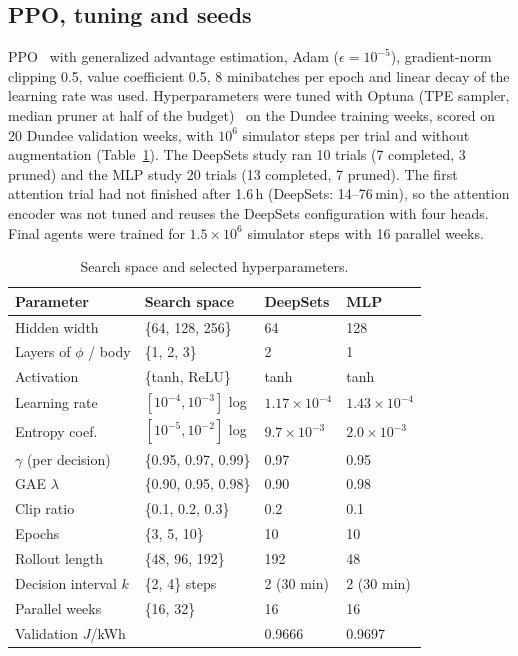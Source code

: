 \documentclass[conference]{IEEEtran}
\begin{document}
\subsection{PPO, tuning and seeds}
PPO~\cite{schulman2017ppo} with generalized advantage estimation, Adam ($\epsilon=10^{-5}$),
gradient-norm clipping 0.5, value coefficient 0.5, 8 minibatches per epoch and linear decay of the
learning rate was used. Hyperparameters were tuned with Optuna (TPE sampler, median pruner at half
of the budget)~\cite{akiba2019optuna} on the Dundee training weeks, scored on 20 Dundee validation
weeks, with $10^6$ simulator steps per trial and without augmentation (Table~\ref{tab:hpo}). The
DeepSets study ran 10 trials (7 completed, 3 pruned) and the MLP study 20 trials (13 completed,
7 pruned). The first attention trial had not finished after 1.6\,h (DeepSets: 14--76\,min), so the
attention encoder was not tuned and reuses
the DeepSets configuration with four heads. Final agents were trained for $1.5\times10^6$ simulator steps with 16 parallel weeks.

\begin{table}[t]
\caption{Search space and selected hyperparameters.}
\label{tab:hpo}
\centering
\footnotesize
\setlength{\tabcolsep}{3pt}
\begin{tabular}{lll l}
\toprule
Parameter & Search space & DeepSets & MLP\\
\midrule
Hidden width & \{64, 128, 256\} & 64 & 128\\
Layers of $\phi$ / body & \{1, 2, 3\} & 2 & 1\\
Activation & \{tanh, ReLU\} & tanh & tanh\\
Learning rate & $[10^{-4},10^{-3}]$ log & $1.17\times10^{-4}$ & $1.43\times10^{-4}$\\
Entropy coef. & $[10^{-5},10^{-2}]$ log & $9.7\times10^{-3}$ & $2.0\times10^{-3}$\\
$\gamma$ (per decision) & \{0.95, 0.97, 0.99\} & 0.97 & 0.95\\
GAE $\lambda$ & \{0.90, 0.95, 0.98\} & 0.90 & 0.98\\
Clip ratio & \{0.1, 0.2, 0.3\} & 0.2 & 0.1\\
Epochs & \{3, 5, 10\} & 10 & 10\\
Rollout length & \{48, 96, 192\} & 192 & 48\\
Decision interval $k$ & \{2, 4\} steps & 2 (30 min) & 2 (30 min)\\
Parallel weeks & \{16, 32\} & 16 & 16\\
\midrule
Validation $J$/kWh & & 0.9666 & 0.9697\\
\bottomrule
\end{tabular}
\end{table}
\end{document}
